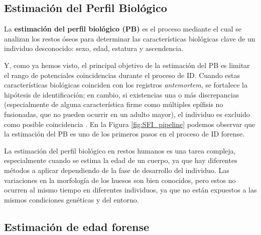 
\subsection{Estimación del Perfil Biológico}

La \textbf{estimación del perfil biológico (PB)} es el proceso mediante el cual se analizan los restos óseos para 
determinar las características biológicas clave de un individuo desconocido: sexo, edad, estatura y ascendencia.

Y, como ya hemos visto, el principal objetivo de la estimación del PB es limitar el rango de potenciales 
coincidencias durante el proceso de ID. Cuando estas características biológicas coinciden con los registros 
\textit{antemortem}, se fortalece la hipótesis de identificación; en cambio, si existencias una o más 
discrepancias (especialmente de alguna característica firme como múltiples epífisis no fusionadas, que no 
pueden ocurrir en un adulto mayor), el individuo es excluido como posible coincidencia 
\cite[cap. 18]{byers2023}. 
En la Figura \ref{fig:SFI_pipeline} podemos observar que la estimación del PB es uno de los primeros 
pasos en el proceso de ID forense. 


La estimación del perfil biológico en restos humanos es una tarea compleja, especialmente cuando se estima la edad
de un cuerpo, ya que hay diferentes métodos a aplicar dependiendo de la fase de desarrollo del individuo. 
Las variaciones en la morfología de los huesos son bien conocidos, pero estos no ocurren al mismo tiempo en 
diferentes individuos, ya que no están expuestos a las mismos condiciones genéticas y del entorno.


\subsection{Estimación de edad forense}

